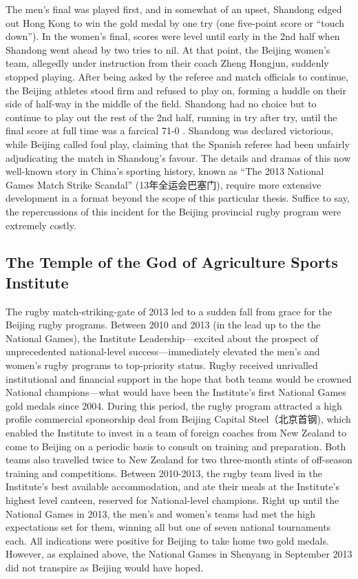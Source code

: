 \begin{CJK}{UTF8}{gbsn}
 The men's final was played first, and in somewhat of an upset, Shandong edged out Hong Kong to win the gold medal by one try (one five-point score or ``touch down'').  In the women's final, scores were level until early in the 2nd half when Shandong went ahead by two tries to nil.  At that point, the Beijing women's team, allegedly under instruction from their coach Zheng Hongjun, suddenly stopped playing.  After being asked by the referee and match officials to continue, the Beijing athletes stood firm and refused to play on, forming a huddle on their side of half-way in the middle of the field. Shandong had no choice but to continue to play out the rest of the 2nd half, running in try after try, until the final score at full time was a farcical 71-0 \citep{Sina2013}.  Shandong was declared victorious, while Beijing called foul play, claiming that the Spanish referee had been unfairly adjudicating the match in Shandong's favour.  The details and dramas of this now well-known story in China's sporting history, known as ``The 2013 National Games Match Strike Scandal'' (13年全运会巴塞门), require more extensive development in a format beyond the scope of this particular thesis.  Suffice to say, the repercussions of this incident for the Beijing provincial rugby program were extremely costly.

 \subsection{The Temple of the God of Agriculture Sports Institute}
 The rugby match-striking-gate of 2013 led to a sudden fall from grace for the Beijing rugby programs.  Between 2010 and 2013 (in the lead up to the the National Games), the Institute Leadership---excited about the prospect of unprecedented national-level success---immediately elevated the men's and women's rugby programs to top-priority status.  Rugby received unrivalled institutional and financial support in the hope that both teams would be crowned National champions---what would have been the Institute's first National Games gold medals since 2004.  During this period, the rugby program attracted a high profile commercial sponsorship deal from Beijing Capital Steel（北京首钢), which enabled the Institute to invest in a team of foreign coaches from New Zealand to come to Beijing on a periodic basis to consult on training and preparation. Both teams also travelled twice to New Zealand for two three-month stints of off-season training and competitions.  Between 2010-2013, the rugby team lived in the Institute's best available accommodation, and ate their meals at the Institute's highest level canteen, reserved for National-level champions.  Right up until the National Games in 2013, the men's and women's teams had met the high expectations set for them, winning all but one of seven national tournaments each.  All indications were positive for Beijing to take home two gold medals.  However, as explained above, the National Games in Shenyang in September 2013 did not transpire as Beijing would have hoped.


\end{CJK}
